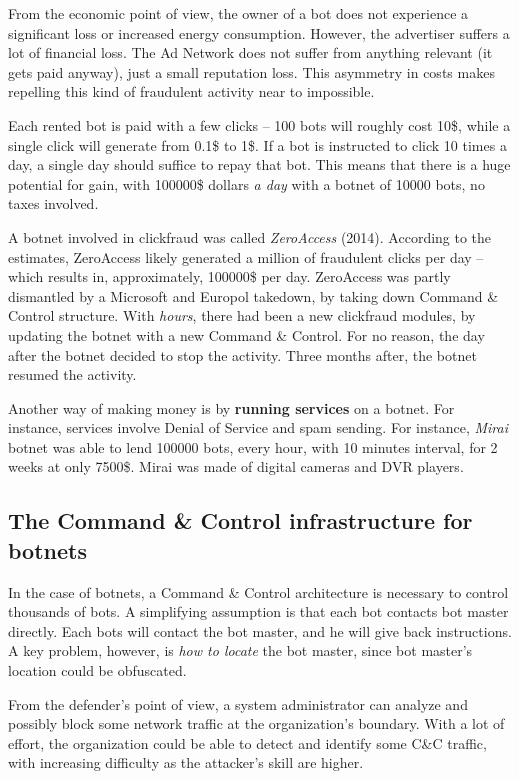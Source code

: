 \documentclass[10pt]{extbook}
\begin{document}
From the economic point of view, the owner of a bot does not experience a
significant loss or increased energy consumption. However, the advertiser
suffers a lot of financial loss. The Ad Network does not suffer from anything
relevant (it gets paid anyway), just a small reputation loss. This asymmetry in
costs makes repelling this kind of fraudulent activity near to impossible.

Each rented bot is paid with a few clicks -- 100 bots will roughly cost 10\$,
while a single click will generate from 0.1\$ to 1\$. If a bot is instructed to
click 10 times a day, a single day should suffice to repay that bot. This means
that there is a huge potential for gain, with 100000\$ dollars \emph{a day}
with a botnet of 10000 bots, no taxes involved.

A botnet involved in clickfraud was called \emph{ZeroAccess} (2014). According
to the estimates, ZeroAccess likely generated a million of fraudulent clicks
per day -- which results in, approximately, 100000\$ per day. ZeroAccess was
partly dismantled by a Microsoft and Europol takedown, by taking down Command
\& Control structure. With \emph{hours}, there had been a new clickfraud
modules, by updating the botnet with a new Command \& Control. For no reason,
the day after the botnet decided to stop the activity. Three months after, the
botnet resumed the activity.

Another way of making money is by \textbf{running services} on a botnet. For
instance, services involve Denial of Service and spam sending. For instance,
\emph{Mirai} botnet was able to lend 100000 bots, every hour, with 10 minutes
interval, for 2 weeks at only 7500\$. Mirai was made of digital cameras and DVR
players.

\subsection{The Command \& Control infrastructure for botnets}

In the case of botnets, a Command \& Control architecture is necessary to
control thousands of bots. A simplifying assumption is that each bot contacts
bot master directly. Each bots will contact the bot master, and he will give
back instructions. A key problem, however, is \emph{how to locate} the bot
master, since bot master's location could be obfuscated.

From the defender's point of view, a system administrator can analyze and
possibly block some network traffic at the organization's boundary. With a lot
of effort, the organization could be able to detect and identify some C\&C
traffic, with increasing difficulty as the attacker's skill are higher.
\end{document}
